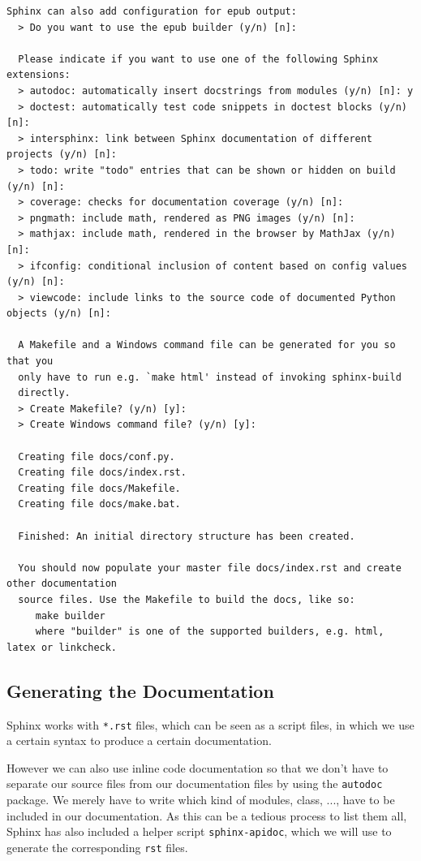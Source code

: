 \documentclass[../main/main.tex]{subfiles}
\begin{document}
\begin{lstlisting}[caption=Example Sphinx-Quickstart, label=lst:sphinx-quickstart]
  Sphinx can also add configuration for epub output:
  > Do you want to use the epub builder (y/n) [n]:

  Please indicate if you want to use one of the following Sphinx extensions:
  > autodoc: automatically insert docstrings from modules (y/n) [n]: y
  > doctest: automatically test code snippets in doctest blocks (y/n) [n]:
  > intersphinx: link between Sphinx documentation of different projects (y/n) [n]:
  > todo: write "todo" entries that can be shown or hidden on build (y/n) [n]:
  > coverage: checks for documentation coverage (y/n) [n]:
  > pngmath: include math, rendered as PNG images (y/n) [n]:
  > mathjax: include math, rendered in the browser by MathJax (y/n) [n]:
  > ifconfig: conditional inclusion of content based on config values (y/n) [n]:
  > viewcode: include links to the source code of documented Python objects (y/n) [n]:

  A Makefile and a Windows command file can be generated for you so that you
  only have to run e.g. `make html' instead of invoking sphinx-build
  directly.
  > Create Makefile? (y/n) [y]:
  > Create Windows command file? (y/n) [y]:

  Creating file docs/conf.py.
  Creating file docs/index.rst.
  Creating file docs/Makefile.
  Creating file docs/make.bat.

  Finished: An initial directory structure has been created.

  You should now populate your master file docs/index.rst and create other documentation
  source files. Use the Makefile to build the docs, like so:
     make builder
     where "builder" is one of the supported builders, e.g. html, latex or linkcheck.
\end{lstlisting}%

\subsection{Generating the Documentation}

Sphinx works with \lstinline|*.rst| files, which can be seen as a script files,
in which we use a certain syntax to produce a certain documentation. 

However we can also use inline code documentation so that we don't have to
separate our source files from our documentation files by using the
\lstinline|autodoc| package. We merely have to write which kind of modules,
class, ..., have to be included in our documentation. As this can be a tedious
process to list them all, Sphinx has also included a helper script
\lstinline|sphinx-apidoc|, which we will use to generate the corresponding
\lstinline|rst| files. 
\end{document}
